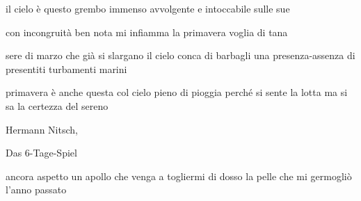 \clearpage


\begin{poem}
	\begin{stanza}
		il cielo è questo grembo immenso\verseline
		avvolgente e intoccabile\verseline
		sulle sue
	\end{stanza}

	\begin{stanza}
		con incongruità ben nota\verseline
		mi infiamma la primavera voglia di tana
	\end{stanza}
\end{poem}

\clearpage


\begin{poem}
	\begin{stanza}
		sere di marzo che già si slargano\verseline
		il cielo conca di barbagli\verseline
		una presenza-assenza\verseline
		di presentiti turbamenti marini
	\end{stanza}
\end{poem}

\clearpage


\begin{poem}
	\begin{stanza}
                primavera è anche questa\verseline
                col cielo pieno di pioggia\verseline
                perché si sente la lotta\verseline
                ma si sa la certezza del sereno
	\end{stanza}
\end{poem}

\clearpage


\begin{artItem}
	Hermann Nitsch, \begin{otherlanguage}{german}%
		Das 6-Tage-Spiel%
	\end{otherlanguage}
\end{artItem}

\begin{poem}
	\begin{stanza}
		ancora aspetto un apollo\verseline
		che venga a togliermi di dosso\verseline
		la pelle che mi germogliò\verseline
		l'anno passato
	\end{stanza}
\end{poem}

\clearpage

